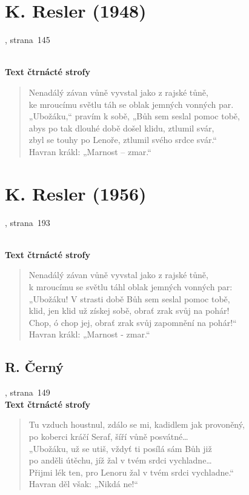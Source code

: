 \documentclass[dp.tex]{subfiles}
\begin{document}
\section*{K. Resler (1948)}
, strana~145
\begin{samepage}
\\\textbf{Text čtrnácté strofy}
\begin{verse}
Nenadálý závan vůně vyvstal jako z rajské tůně,\\
ke mroucímu světlu táh se oblak jemných vonných par.\\
„Ubožáku,“ pravím k sobě, „Bůh sem seslal pomoc tobě,\\
abys po tak dlouhé době došel klidu, ztlumil svár,\\
zbyl se touhy po Lenoře, ztlumil svého srdce svár.“\\
\hspace*{0.8cm}Havran krákl: „Marnost -- zmar.“
\end{verse}
\end{samepage}

\section*{K. Resler (1956)}
, strana~193
\begin{samepage}
\\\textbf{Text čtrnácté strofy}
\begin{verse}
Nenadálý závan vůně vyvstal jako z rajské tůně,\\
k mroucímu se světlu táhl oblak jemných vonných par:\\
„Ubožáku! V strasti době Bůh sem seslal pomoc tobě,\\
klid, jen klid už získej sobě, obrať zrak svůj na pohár!\\
Chop, ó chop jej, obrať zrak svůj zapomnění na pohár!“\\
\hspace*{0.8cm}Havran krákl: „Marnost - zmar.“
\end{verse}
\end{samepage}

\begin{samepage}
	\section*{R. Černý}
	, strana~149
	\\\textbf{Text čtrnácté strofy}
	\begin{verse}
	Tu vzduch houstnul, zdálo se mi, kadidlem jak provoněný,\\
	po koberci kráčí Seraf, šíří vůně posvátné\ldots\\
	„Ubožáku, už se utiš, vždyť ti posílá sám Bůh již\\
	po anděli útěchu, jíž žal v tvém srdci vychladne\ldots\\
	Přijmi lék ten, pro Lenoru žal v tvém srdci vychladne.“\\
	\hspace*{0.8cm}Havran děl však: „Nikdá ne!“
	\end{verse}
\end{samepage}
\end{document}
